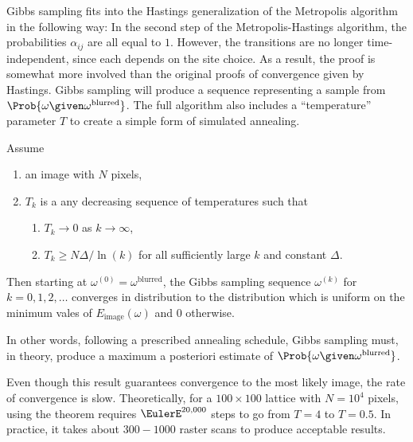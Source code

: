 \documentclass[12pt]{article}
\begin{document}
Gibbs sampling fits into the Hastings generalization of the Metropolis
algorithm in the following way:  In the second step of the
Metropolis-Hastings algorithm, the probabilities \( \alpha_{ij} \) are
all equal to \( 1 \).  However, the transitions are no longer
time-independent, since each depends on the site choice.  As a result,
the proof is somewhat more involved than the original proofs of
convergence given by Hastings.  Gibbs sampling will produce a sequence
representing a sample from \( \Prob{\omega \given \omega^{\text{blurred}}}
\).  The full algorithm also includes a ``temperature'' parameter \( T \)
to create a simple form of simulated annealing.

\begin{theorem}
    Assume
    \begin{enumerate}
        \item
            an image with \( N \) pixels,
        \item
            \( T_k \) is a any decreasing sequence of temperatures such
            that
            \begin{enumerate}
                \item
                    \( T_k \to 0 \) as \( k \to \infty \),
                \item
                    \( T_k \ge N \Delta/\ln(k) \) for all sufficiently
                    large \( k \) and constant \( \Delta \).
            \end{enumerate}
    \end{enumerate}
    Then starting at \( \omega^{(0)} = \omega^{\text{blurred}} \), the
    Gibbs sampling sequence \( \omega^{(k)} \) for \( k=0,1,2, \dots \)
    converges in distribution to the distribution which is uniform on
    the minimum vales of \( E_{\text{image}}(\omega) \) and \( 0 \)
    otherwise.
\end{theorem}

In other words, following a prescribed annealing schedule, Gibbs
sampling must, in theory, produce a maximum a posteriori estimate of \(
\Prob{\omega \given \omega^{\text{blurred}}} \).

Even though this result guarantees convergence to the most likely image,
the rate of convergence is slow.  Theoretically, for a \( 100 \times 100 \) lattice
with \( N = 10^4 \) pixels, using the theorem requires \( \EulerE^{20{,}000}
\) steps to go from \( T = 4 \) to \( T = 0.5 \).  In practice, it takes
about \( 300 - 1000 \) raster scans to produce acceptable results.
\end{document}
